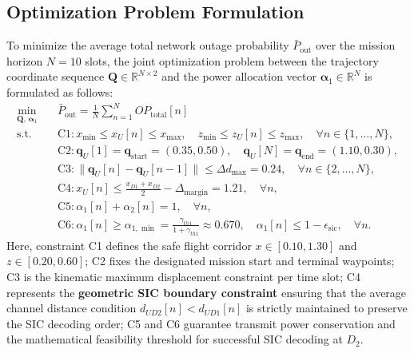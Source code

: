 \subsection*{Optimization Problem Formulation}

To minimize the average total network outage probability $\bar{P}_{\text{out}}$ over the mission horizon $N = 10$ slots, the joint optimization problem between the trajectory coordinate sequence $\mathbf{Q} \in \mathbb{R}^{N \times 2}$ and the power allocation vector $\boldsymbol{\alpha}_1 \in \mathbb{R}^N$ is formulated as follows:
\begin{subequations}
\label{eq:opt_problem}
\begin{align}
\min_{\mathbf{Q}, \, \boldsymbol{\alpha}_1} \quad & \bar{P}_{\text{out}} = \frac{1}{N} \sum_{n=1}^N OP_{\text{total}}[n] \label{eq:obj} \\
\text{s.t.} \quad 
& \text{C1}: x_{\min} \le x_U[n] \le x_{\max}, \quad z_{\min} \le z_U[n] \le z_{\max}, \quad \forall n \in \{1, \dots, N\}, \label{eq:c1} \\
& \text{C2}: \mathbf{q}_U[1] = \mathbf{q}_{\text{start}} = (0.35, 0.50), \quad \mathbf{q}_U[N] = \mathbf{q}_{\text{end}} = (1.10, 0.30), \label{eq:c2} \\
& \text{C3}: \|\mathbf{q}_U[n] - \mathbf{q}_U[n-1]\| \le \Delta d_{\max} = 0.24, \quad \forall n \in \{2, \dots, N\}, \label{eq:c3} \\
& \text{C4}: x_U[n] \le \frac{x_{D1} + x_{D2}}{2} - \Delta_{\text{margin}} = 1.21, \quad \forall n, \label{eq:c4} \\
& \text{C5}: \alpha_1[n] + \alpha_2[n] = 1, \quad \forall n, \label{eq:c5} \\
& \text{C6}: \alpha_1[n] \ge \alpha_{1,\min} = \frac{\gamma_{th1}}{1 + \gamma_{th1}} \approx 0.670, \quad \alpha_1[n] \le 1 - \epsilon_{\text{sic}}, \quad \forall n. \label{eq:c6}
\end{align}
\end{subequations}
Here, constraint C1 defines the safe flight corridor $x \in [0.10, 1.30]$ and $z \in [0.20, 0.60]$; C2 fixes the designated mission start and terminal waypoints; C3 is the kinematic maximum displacement constraint per time slot; C4 represents the \textbf{geometric SIC boundary constraint} ensuring that the average channel distance condition $d_{UD2}[n] < d_{UD1}[n]$ is strictly maintained to preserve the SIC decoding order; C5 and C6 guarantee transmit power conservation and the mathematical feasibility threshold for successful SIC decoding at $D_2$.

